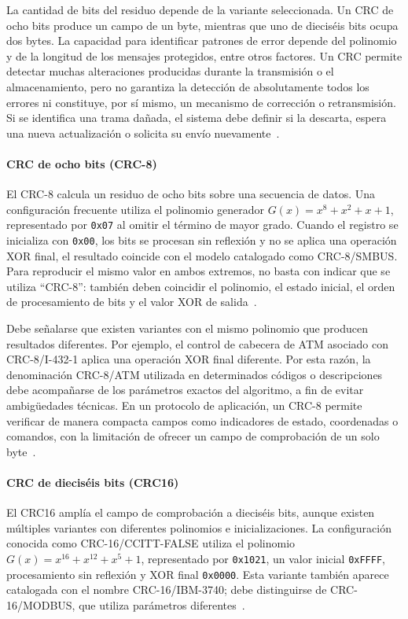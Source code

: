 La cantidad de bits del residuo depende de la variante seleccionada. Un CRC de ocho bits produce un campo de un byte, mientras que uno de dieciséis bits ocupa dos bytes. La capacidad para identificar patrones de error depende del polinomio y de la longitud de los mensajes protegidos, entre otros factores. Un CRC permite detectar muchas alteraciones producidas durante la transmisión o el almacenamiento, pero no garantiza la detección de absolutamente todos los errores ni constituye, por sí mismo, un mecanismo de corrección o retransmisión. Si se identifica una trama dañada, el sistema debe definir si la descarta, espera una nueva actualización o solicita su envío nuevamente~\cite{williams1993crc}.

\paragraph{CRC de ocho bits (CRC-8)}
El CRC-8 calcula un residuo de ocho bits sobre una secuencia de datos. Una configuración frecuente utiliza el polinomio generador $G(x)=x^{8}+x^{2}+x+1$, representado por \texttt{0x07} al omitir el término de mayor grado. Cuando el registro se inicializa con \texttt{0x00}, los bits se procesan sin reflexión y no se aplica una operación XOR final, el resultado coincide con el modelo catalogado como CRC-8/SMBUS. Para reproducir el mismo valor en ambos extremos, no basta con indicar que se utiliza ``CRC-8'': también deben coincidir el polinomio, el estado inicial, el orden de procesamiento de bits y el valor XOR de salida~\cite{reveng2023crc,williams1993crc}.

Debe señalarse que existen variantes con el mismo polinomio que producen resultados diferentes. Por ejemplo, el control de cabecera de ATM asociado con CRC-8/I-432-1 aplica una operación XOR final diferente. Por esta razón, la denominación CRC-8/ATM utilizada en determinados códigos o descripciones debe acompañarse de los parámetros exactos del algoritmo, a fin de evitar ambigüedades técnicas. En un protocolo de aplicación, un CRC-8 permite verificar de manera compacta campos como indicadores de estado, coordenadas o comandos, con la limitación de ofrecer un campo de comprobación de un solo byte~\cite{reveng2023crc}.

\paragraph{CRC de dieciséis bits (CRC16)}
El CRC16 amplía el campo de comprobación a dieciséis bits, aunque existen múltiples variantes con diferentes polinomios e inicializaciones. La configuración conocida como CRC-16/CCITT-FALSE utiliza el polinomio $G(x)=x^{16}+x^{12}+x^{5}+1$, representado por \texttt{0x1021}, un valor inicial \texttt{0xFFFF}, procesamiento sin reflexión y XOR final \texttt{0x0000}. Esta variante también aparece catalogada con el nombre CRC-16/IBM-3740; debe distinguirse de CRC-16/MODBUS, que utiliza parámetros diferentes~\cite{reveng2023crc}.

